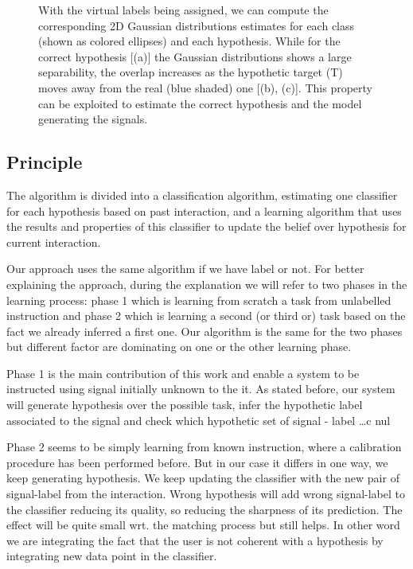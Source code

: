 \begin{figure}[!ht]
{With the virtual labels being assigned, we can compute the corresponding 2D Gaussian distributions estimates for each class (shown as colored ellipses) and each hypothesis. While for the correct hypothesis [(a)] the Gaussian distributions shows a large separability, the overlap increases as the hypothetic target (T) moves away from the real (blue shaded) one [(b), (c)]. This property can be exploited to estimate the correct hypothesis and the model generating the signals.}
\label{fig:GM}
\end{figure}

\subsection{Principle}

The algorithm is  divided into a classification algorithm, estimating one classifier for each hypothesis based on past interaction, and a learning algorithm that uses the results and properties of this classifier to update the belief over hypothesis for current interaction.

Our approach uses the same algorithm if we have label or not. For better explaining the approach, during the explanation we will refer to two phases in the learning process: phase 1 which is learning from scratch a task from unlabelled instruction and phase 2 which is learning a second (or third or) task based on the fact we already inferred a first one. Our algorithm is the same for the two phases but different factor are dominating on one or the other learning phase.

Phase 1 is the main contribution of this work and enable a system to be instructed using signal initially unknown to the it. As stated before, our system will generate hypothesis over the possible task, infer the hypothetic label associated to the signal and check which hypothetic set of signal - label \ldots c nul

Phase 2 seems to be simply learning from known instruction, where a calibration procedure has been performed before. But in our case it differs in one way, we keep generating hypothesis. We keep updating the classifier with the new pair of signal-label from the interaction. Wrong hypothesis will add wrong signal-label to the classifier reducing its quality, so reducing the sharpness of its prediction. The effect will be quite small wrt. the matching process but still helps. In other word we are integrating the fact that the user is not coherent with a hypothesis by integrating new data point in the classifier.

